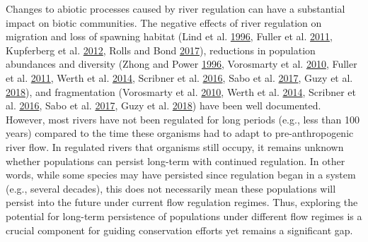 \documentclass[twoside,12pt,final]{ucthesis-CA2012} %
\begin{document}
\begin{ucmainmatter}
Changes to abiotic processes caused by river regulation can have a
substantial impact on biotic communities. The negative effects of river
regulation on migration and loss of spawning habitat (Lind et al.
\protect\hyperlink{ref-lind_effects_1996}{1996}, Fuller et al.
\protect\hyperlink{ref-fuller_linking_2011}{2011}, Kupferberg et al.
\protect\hyperlink{ref-kupferberg_effects_2012}{2012}, Rolls and Bond
\protect\hyperlink{ref-rolls_environmental_2017}{2017}), reductions in
population abundances and diversity (Zhong and Power
\protect\hyperlink{ref-zhong_environmental_1996}{1996}, Vorosmarty et
al. \protect\hyperlink{ref-vorosmarty_global_2010}{2010}, Fuller et al.
\protect\hyperlink{ref-fuller_linking_2011}{2011}, Werth et al.
\protect\hyperlink{ref-werth_dams_2014}{2014}, Scribner et al.
\protect\hyperlink{ref-scribner_applications_2016}{2016}, Sabo et al.
\protect\hyperlink{ref-sabo_designing_2017}{2017}, Guzy et al.
\protect\hyperlink{ref-guzy_influence_2018}{2018}), and fragmentation
(Vorosmarty et al. \protect\hyperlink{ref-vorosmarty_global_2010}{2010},
Werth et al. \protect\hyperlink{ref-werth_dams_2014}{2014}, Scribner et
al. \protect\hyperlink{ref-scribner_applications_2016}{2016}, Sabo et
al. \protect\hyperlink{ref-sabo_designing_2017}{2017}, Guzy et al.
\protect\hyperlink{ref-guzy_influence_2018}{2018}) have been well
documented. However, most rivers have not been regulated for long
periods (e.g., less than 100 years) compared to the time these organisms
had to adapt to pre-anthropogenic river flow. In regulated rivers that
organisms still occupy, it remains unknown whether populations can
persist long-term with continued regulation. In other words, while some
species may have persisted since regulation began in a system (e.g.,
several decades), this does not necessarily mean these populations will
persist into the future under current flow regulation regimes. Thus,
exploring the potential for long-term persistence of populations under
different flow regimes is a crucial component for guiding conservation
efforts yet remains a significant gap.


\end{ucmainmatter}
\end{document}
